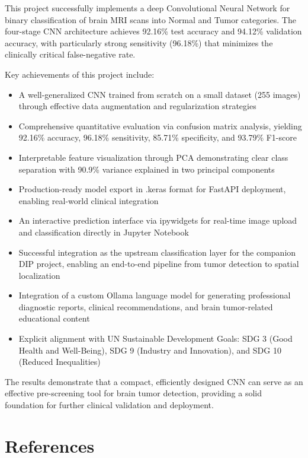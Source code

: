 \documentclass[12pt,a4paper]{article}
\begin{document}
This project successfully implements a deep Convolutional Neural Network for binary classification of brain MRI scans into Normal and Tumor categories. The four-stage CNN architecture achieves 92.16\% test accuracy and 94.12\% validation accuracy, with particularly strong sensitivity (96.18\%) that minimizes the clinically critical false-negative rate.

Key achievements of this project include:

\begin{itemize}
    \item A well-generalized CNN trained from scratch on a small dataset (255 images) through effective data augmentation and regularization strategies
    \item Comprehensive quantitative evaluation via confusion matrix analysis, yielding 92.16\% accuracy, 96.18\% sensitivity, 85.71\% specificity, and 93.79\% F1-score
    \item Interpretable feature visualization through PCA demonstrating clear class separation with 90.9\% variance explained in two principal components
    \item Production-ready model export in .keras format for FastAPI deployment, enabling real-world clinical integration
    \item An interactive prediction interface via ipywidgets for real-time image upload and classification directly in Jupyter Notebook
    \item Successful integration as the upstream classification layer for the companion DIP project, enabling an end-to-end pipeline from tumor detection to spatial localization
    \item Integration of a custom Ollama language model for generating professional diagnostic reports, clinical recommendations, and brain tumor-related educational content
    \item Explicit alignment with UN Sustainable Development Goals: SDG 3 (Good Health and Well-Being), SDG 9 (Industry and Innovation), and SDG 10 (Reduced Inequalities)
\end{itemize}

The results demonstrate that a compact, efficiently designed CNN can serve as an effective pre-screening tool for brain tumor detection, providing a solid foundation for further clinical validation and deployment.

\newpage

\section{References}
\end{document}
